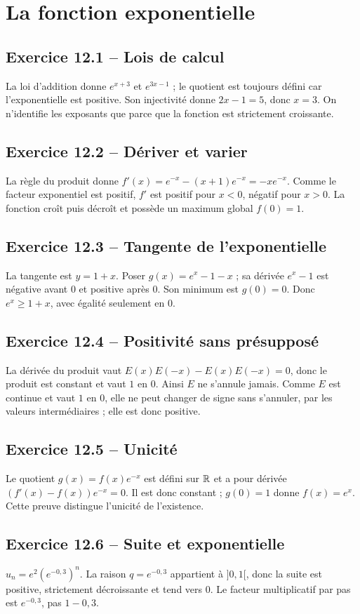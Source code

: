 \chapter{La fonction exponentielle}
\section*{Exercice 12.1 -- Lois de calcul}
La loi d'addition donne $e^{x+3}$ et $e^{3x-1}$ ; le quotient est toujours défini car l'exponentielle est positive. Son injectivité donne $2x-1=5$, donc $x=3$. On n'identifie les exposants que parce que la fonction est strictement croissante.

\section*{Exercice 12.2 -- Dériver et varier}
La règle du produit donne $f'(x)=e^{-x}-(x+1)e^{-x}=-xe^{-x}$. Comme le facteur exponentiel est positif, $f'$ est positif pour $x<0$, négatif pour $x>0$. La fonction croît puis décroît et possède un maximum global $f(0)=1$.

\section*{Exercice 12.3 -- Tangente de l'exponentielle}
La tangente est $y=1+x$. Poser $g(x)=e^x-1-x$ ; sa dérivée $e^x-1$ est négative avant $0$ et positive après $0$. Son minimum est $g(0)=0$. Donc $e^x\ge1+x$, avec égalité seulement en $0$.

\section*{Exercice 12.4 -- Positivité sans présupposé}
La dérivée du produit vaut $E(x)E(-x)-E(x)E(-x)=0$, donc le produit est constant et vaut $1$ en $0$. Ainsi $E$ ne s'annule jamais. Comme $E$ est continue et vaut $1$ en $0$, elle ne peut changer de signe sans s'annuler, par les valeurs intermédiaires ; elle est donc positive.

\section*{Exercice 12.5 -- Unicité}
Le quotient $g(x)=f(x)e^{-x}$ est défini sur $\mathbb{R}$ et a pour dérivée $(f'(x)-f(x))e^{-x}=0$. Il est donc constant ; $g(0)=1$ donne $f(x)=e^x$. Cette preuve distingue l'unicité de l'existence.

\section*{Exercice 12.6 -- Suite et exponentielle}
$u_n=e^2(e^{-0{,}3})^n$. La raison $q=e^{-0{,}3}$ appartient à $]0,1[$, donc la suite est positive, strictement décroissante et tend vers $0$. Le facteur multiplicatif par pas est $e^{-0{,}3}$, pas $1-0{,}3$.
